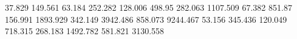 37.829     149.561    %
63.184     252.282    %
128.006    498.95     %
282.063    1107.509   %
67.382     851.87     %
156.991    1893.929   %
342.149    3942.486   %
858.073    9244.467   %
53.156     345.436    %
120.049    718.315    %
268.183    1492.782   %
581.821    3130.558   %
